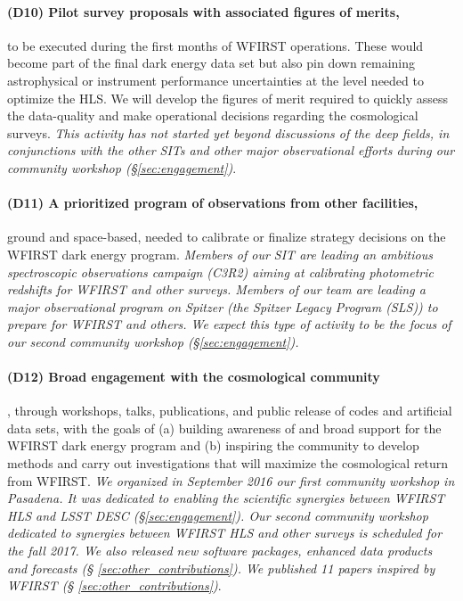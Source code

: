 \paragraph*{(D10) Pilot survey proposals with associated figures of merits,} to
be executed during the first months of WFIRST operations. These would become
part of the final dark energy data set but also pin down remaining astrophysical
or instrument performance uncertainties at the level needed to optimize the HLS.
We will develop the figures of merit required to quickly assess the data-quality
and make operational decisions regarding the cosmological surveys. \emph{This
activity has not started yet beyond discussions of the deep fields, in
conjunctions with the other SITs and other major observational efforts during
our community workshop (\S \ref{sec:engagement})}.

\paragraph*{(D11) A prioritized program of observations from other facilities,}
ground and space-based, needed to calibrate or finalize strategy decisions on
the WFIRST dark energy program. \emph{Members of our SIT are leading an
ambitious spectroscopic observations campaign (C3R2) aiming at calibrating photometric redshifts
for WFIRST and other surveys. Members of our team are leading a major
observational program on Spitzer (the Spitzer Legacy Program (SLS)) to prepare for WFIRST and others. We expect this type of activity to be the focus of our second community workshop (\S \ref{sec:engagement}).}

\paragraph*{(D12) Broad engagement with the cosmological community}, through
workshops, talks, publications, and public release of codes and artificial data
sets, with the goals of (a) building awareness of and broad support for the
WFIRST dark energy program and (b) inspiring the community to develop methods
and carry out investigations that will maximize the cosmological return from
WFIRST. \emph{We organized in September 2016 our first community workshop in
Pasadena. It was dedicated to enabling the scientific synergies between WFIRST HLS and
LSST DESC (\S \ref{sec:engagement}). Our second community workshop dedicated to
synergies between WFIRST HLS and other surveys is scheduled for the fall 2017. We also
released new software packages, enhanced data products and forecasts (\S
\ref{sec:other_contributions}). We published 11 papers inspired by WFIRST (\S
\ref{sec:other_contributions})}.
